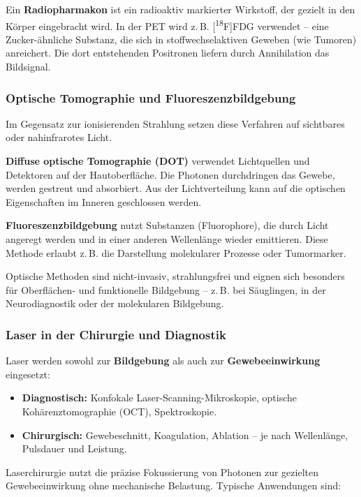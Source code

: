 \vspace{1em}
\begin{tcolorbox}[didaktikbox, title=Begriffserklärung: Radiopharmakon]
	\label{box:radiopharmakon}
	\small
	Ein \textbf{Radiopharmakon} ist ein radioaktiv markierter Wirkstoff, der gezielt in den Körper eingebracht wird. In der PET wird z.\,B. [\textsuperscript{18}F]FDG verwendet – eine Zucker-ähnliche Substanz, die sich in stoffwechselaktiven Geweben (wie Tumoren) anreichert. Die dort entstehenden Positronen liefern durch Annihilation das Bildsignal.
\end{tcolorbox}

\subsubsection{Optische Tomographie und Fluoreszenzbildgebung}

Im Gegensatz zur ionisierenden Strahlung setzen diese Verfahren auf sichtbares oder nahinfrarotes Licht.

\textbf{Diffuse optische Tomographie (DOT)} verwendet Lichtquellen und Detektoren auf der Hautoberfläche. Die Photonen durchdringen das Gewebe, werden gestreut und absorbiert. Aus der Lichtverteilung kann auf die optischen Eigenschaften im Inneren geschlossen werden.

\textbf{Fluoreszenzbildgebung} nutzt Substanzen (Fluorophore), die durch Licht angeregt werden und in einer anderen Wellenlänge wieder emittieren. Diese Methode erlaubt z.\,B. die Darstellung molekularer Prozesse oder Tumormarker.
\vspace{1em}
\begin{tcolorbox}[didaktikbox, title=Vorteil optischer Verfahren]
	\label{box:optisches Verfahren}
	\small
	Optische Methoden sind nicht-invasiv, strahlungsfrei und eignen sich besonders für Oberflächen- und funktionelle Bildgebung – z.\,B. bei Säuglingen, in der Neurodiagnostik oder der molekularen Bildgebung.
\end{tcolorbox}

\subsubsection{Laser in der Chirurgie und Diagnostik}

Laser werden sowohl zur \textbf{Bildgebung} als auch zur \textbf{Gewebeeinwirkung} eingesetzt:

\begin{itemize}
	\item \textbf{Diagnostisch:} Konfokale Laser-Scanning-Mikroskopie, optische Kohärenztomographie (OCT), Spektroskopie.
	\item \textbf{Chirurgisch:} Gewebeschnitt, Koagulation, Ablation – je nach Wellenlänge, Pulsdauer und Leistung.
\end{itemize}
\newpage
\noindent
Laserchirurgie nutzt die präzise Fokussierung von Photonen zur gezielten Gewebeeinwirkung ohne mechanische Belastung. Typische Anwendungen sind:

